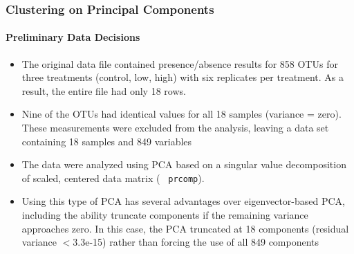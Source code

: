 \documentclass[10pt]{beamer}
\begin{document}
\begin{frame}[fragile]
\frametitle{Clustering on Principal Components}
\framesubtitle{Preliminary Data Decisions}

{\footnotesize

\begin{itemize}
\item The original data file contained presence/absence results for 858 OTUs
  for three treatments (control, low, high) with six replicates per
  treatment.  As a result, the entire file had only 18 rows.

\vspace{1ex}
\item Nine of the OTUs had identical values for all 18 samples
  (variance = zero).  These measurements were excluded from the
  analysis, leaving a data set containing 18 samples and 849 variables

\vspace{1ex}
\item The data were analyzed using PCA based on a singular value
  decomposition of scaled, centered data matrix ({\color{red} \tt
    prcomp}). 

\vspace{1ex}
\item Using this type of PCA has several advantages over
  eigenvector-based PCA, including the ability truncate components if
  the remaining variance approaches zero. In this case, the PCA
  truncated at 18 components (residual variance $<$3.3e-15) rather
  than forcing the use of all 849 components\\
\end{itemize}
}
\end{frame}
\end{document}
